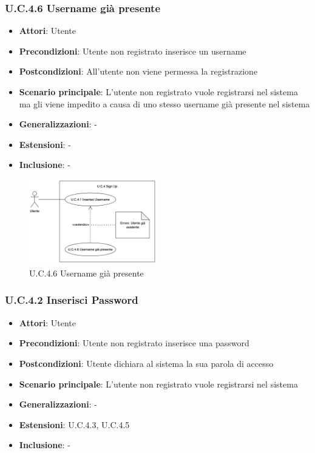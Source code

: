 \subsubsection{U.C.4.6 Username già presente}
\begin{itemize}
    \item \textbf{Attori}: Utente
    \item \textbf{Precondizioni}: Utente non registrato inserisce un username
    \item \textbf{Postcondizioni}: All'utente non viene permessa la registrazione
    \item \textbf{Scenario principale}: L’utente non registrato vuole registrarsi nel sistema ma gli viene impedito a causa di uno stesso username già presente nel sistema
    \item \textbf{Generalizzazioni}: -
    \item \textbf{Estensioni}: -
    \item \textbf{Inclusione}: -
\end{itemize}
\begin{figure}[H]
    \centering
    \includegraphics[width=0.5\textwidth]{img/UC4-6.png}
    \caption{U.C.4.6 Username già presente}
\end{figure}
\subsubsection{U.C.4.2 Inserisci Password}
\begin{itemize}
    \item \textbf{Attori}: Utente
    \item \textbf{Precondizioni}: Utente non registrato inserisce una password
    \item \textbf{Postcondizioni}: Utente dichiara al sistema la sua parola di accesso
    \item \textbf{Scenario principale}: L’utente non registrato vuole registrarsi nel sistema
    \item \textbf{Generalizzazioni}: -
    \item \textbf{Estensioni}: U.C.4.3, U.C.4.5
    \item \textbf{Inclusione}: -
\end{itemize}
